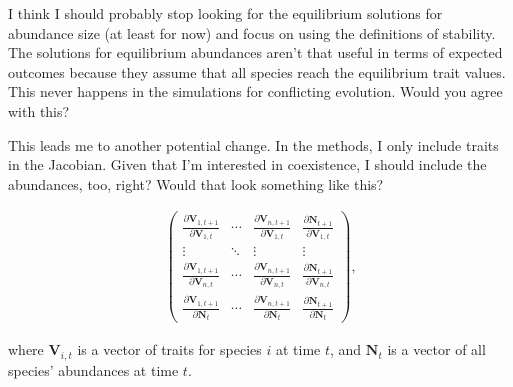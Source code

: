 \documentclass[11pt]{article}
\begin{document}
I think I should probably stop looking for the equilibrium solutions for abundance size
(at least for now) and focus on using the \citet{Geritz:1998es} definitions of stability.
The solutions for equilibrium abundances aren't that useful in terms of expected
outcomes because they assume that all species reach the equilibrium trait values.
This never happens in the simulations for conflicting evolution.
Would you agree with this?

This leads me to another potential change.
In the methods, I only include traits in the Jacobian.
Given that I'm interested in coexistence, I should include the abundances, too, right?
Would that look something like this?

\begin{equation*}
\begin{split}
    \begin{pmatrix}
        \frac{\partial \mathbf{V}_{1,t+1}}{\partial \mathbf{V}_{1,t}} & \cdots &
            \frac{\partial \mathbf{V}_{n,t+1}}{\partial \mathbf{V}_{1,t}} &
            \frac{\partial \mathbf{N}_{t+1}}{\partial \mathbf{V}_{1,t}} \\
        \vdots & \ddots & \vdots & \vdots \\
        \frac{\partial \mathbf{V}_{1,t+1}}{\partial \mathbf{V}_{n,t}} & \cdots &
            \frac{\partial \mathbf{V}_{n,t+1}}{\partial \mathbf{V}_{n,t}} &
            \frac{\partial \mathbf{N}_{t+1}}{\partial \mathbf{V}_{n,t}} \\
        \frac{\partial \mathbf{V}_{1,t+1}}{\partial \mathbf{N}_{t}} & \cdots &
            \frac{\partial \mathbf{V}_{n,t+1}}{\partial \mathbf{N}_{t}} &
            \frac{\partial \mathbf{N}_{t+1}}{\partial \mathbf{N}_{t}}
    \end{pmatrix}
    \text{,}
\end{split}
\end{equation*}

where $\mathbf{V}_{i,t}$ is a vector of traits for species $i$ at time $t$, and
$\mathbf{N}_t$ is a vector of all species' abundances at time $t$.




\clearpage




\end{document}
